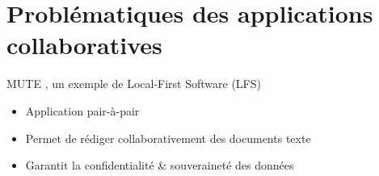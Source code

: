 \section{Problématiques des applications collaboratives}

\begin{frame}{MUTE , un exemple de Local-First Software (LFS) \cite{localfirstsoftware2019}}
    \vspace{-0.5cm}
    \begin{figure}
    \end{figure}
    \vspace{-0.5cm}
    \begin{itemize}
        \item Application pair-à-pair
        \item Permet de rédiger collaborativement des documents texte
        \item Garantit la confidentialité \& souveraineté des données
    \end{itemize}
\end{frame}

